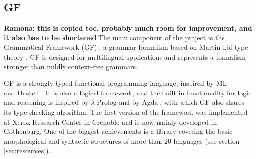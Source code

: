 \documentclass[runningheads,a4paper]{llncs}
\begin{document}
\subsection{GF}
\label{sec:gf}
\textbf{Ramona: this is copied too, probably much room for improvement,
and it also has to be shortened}
The main component of the project is the Grammatical Framework (GF) \cite{gfbok},
a grammar formalism based on Martin-Löf type theory \cite{martinlof}. GF is
designed for multilingual applications and represents a formalism
stronger than mildly context-free grammars. 

GF is a strongly typed functional programming language, inspired by
ML \\\cite{ml} and Haskell \cite{haskell}. It is also a logical framework,
and the built-in functionality for logic and reasoning 
is inspired by $\lambda$ Prolog \cite{prolog} and 
by Agda \cite{agda}, with which GF also shares its type checking algorithm.
The first version of the framework was implemented at Xerox Research Center
in Grenoble and is now mainly developed in Gothenburg. One of the biggest
achievements is a library covering the 
basic morphological and syntactic structures of more than
20 languages (see section \ref{sec:resources}).
\end{document}
